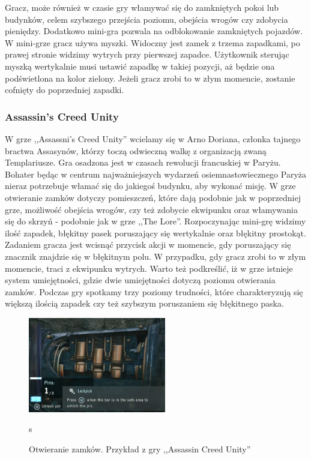 \documentclass[oneside,polski,logo]{amuthesis}
\begin{document}
Gracz, może również w czasie gry włamywać się do zamkniętych pokoi lub budynków, celem szybszego przejścia poziomu, obejścia wrogów czy zdobycia pieniędzy. Dodatkowo mini-gra pozwala na odblokowanie zamkniętych pojazdów. W mini-grze gracz używa myszki. Widoczny jest zamek z trzema zapadkami, po prawej stronie widzimy wytrych przy pierwszej zapadce. Użytkownik sterując myszką wertykalnie musi ustawić zapadkę w takiej pozycji, aż będzie ona podświetlona na kolor zielony. Jeżeli gracz zrobi to w złym momencie, zostanie cofnięty do poprzedniej zapadki. \cite{Mafia2}

\subsubsection{Assassin's Creed Unity}
\par W grze ,,Assassni's Creed Unity'' wcielamy się w Arno Doriana, członka tajnego bractwa Assasynów, którzy toczą odwieczną walkę z organizacją zwaną Templariusze. Gra osadzona jest w czasach rewolucji francuskiej w Paryżu. Bohater będąc w centrum najważniejszych wydarzeń osiemnastowiecznego Paryża nieraz potrzebuje włamać się do jakiegoś budynku, aby wykonać misję. W grze otwieranie zamków dotyczy pomieszczeń, które dają podobnie jak w poprzedniej grze, możliwość obejścia wrogów, czy też zdobycie ekwipunku oraz włamywania się do skrzyń - podobnie jak w grze ,,The Lore''. Rozpoczynając mini-grę widzimy ilość zapadek, błękitny pasek poruszający się wertykalnie oraz błękitny prostokąt. Zadaniem gracza jest wcisnąć przycisk akcji w momencie, gdy poruszający się znacznik znajdzie się w błękitnym polu. W przypadku, gdy gracz zrobi to w złym momencie, traci z ekwipunku wytrych. Warto też podkreślić, iż w grze istnieje system umiejętności, gdzie dwie umiejętności dotyczą poziomu otwierania zamków. Podczas gry spotkamy trzy poziomy trudności, które charakteryzują się większą ilością zapadek czy też szybszym poruszaniem się błękitnego paska. \cite{acu}
\begin{figure}[h]
	\centering
	\includegraphics[width=6cm]{images/tyrek/acu.png}
	\caption{Otwieranie zamków. Przykład z gry ,,Assassin Creed Unity''}s
\end{figure}
\end{document}

